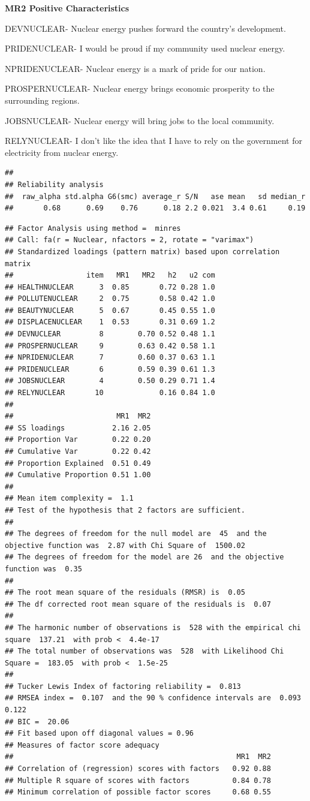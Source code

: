 \documentclass[
]{article}
\begin{document}
\textbf{MR2 Positive Characteristics}

DEVNUCLEAR- Nuclear energy pushes forward the country's development.

PRIDENUCLEAR- I would be proud if my community used nuclear energy.

NPRIDENUCLEAR- Nuclear energy is a mark of pride for our nation.

PROSPERNUCLEAR- Nuclear energy brings economic prosperity to the
surrounding regions.

JOBSNUCLEAR- Nuclear energy will bring jobs to the local community.

RELYNUCLEAR- I don't like the idea that I have to rely on the government
for electricity from nuclear energy.

\begin{verbatim}
## 
## Reliability analysis   
##  raw_alpha std.alpha G6(smc) average_r S/N   ase mean   sd median_r
##       0.68      0.69    0.76      0.18 2.2 0.021  3.4 0.61     0.19
\end{verbatim}

\begin{verbatim}
## Factor Analysis using method =  minres
## Call: fa(r = Nuclear, nfactors = 2, rotate = "varimax")
## Standardized loadings (pattern matrix) based upon correlation matrix
##                 item   MR1   MR2   h2   u2 com
## HEALTHNUCLEAR      3  0.85       0.72 0.28 1.0
## POLLUTENUCLEAR     2  0.75       0.58 0.42 1.0
## BEAUTYNUCLEAR      5  0.67       0.45 0.55 1.0
## DISPLACENUCLEAR    1  0.53       0.31 0.69 1.2
## DEVNUCLEAR         8        0.70 0.52 0.48 1.1
## PROSPERNUCLEAR     9        0.63 0.42 0.58 1.1
## NPRIDENUCLEAR      7        0.60 0.37 0.63 1.1
## PRIDENUCLEAR       6        0.59 0.39 0.61 1.3
## JOBSNUCLEAR        4        0.50 0.29 0.71 1.4
## RELYNUCLEAR       10             0.16 0.84 1.0
## 
##                        MR1  MR2
## SS loadings           2.16 2.05
## Proportion Var        0.22 0.20
## Cumulative Var        0.22 0.42
## Proportion Explained  0.51 0.49
## Cumulative Proportion 0.51 1.00
## 
## Mean item complexity =  1.1
## Test of the hypothesis that 2 factors are sufficient.
## 
## The degrees of freedom for the null model are  45  and the objective function was  2.87 with Chi Square of  1500.02
## The degrees of freedom for the model are 26  and the objective function was  0.35 
## 
## The root mean square of the residuals (RMSR) is  0.05 
## The df corrected root mean square of the residuals is  0.07 
## 
## The harmonic number of observations is  528 with the empirical chi square  137.21  with prob <  4.4e-17 
## The total number of observations was  528  with Likelihood Chi Square =  183.05  with prob <  1.5e-25 
## 
## Tucker Lewis Index of factoring reliability =  0.813
## RMSEA index =  0.107  and the 90 % confidence intervals are  0.093 0.122
## BIC =  20.06
## Fit based upon off diagonal values = 0.96
## Measures of factor score adequacy             
##                                                    MR1  MR2
## Correlation of (regression) scores with factors   0.92 0.88
## Multiple R square of scores with factors          0.84 0.78
## Minimum correlation of possible factor scores     0.68 0.55
\end{verbatim}
\end{document}
